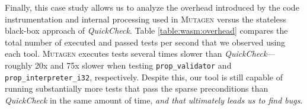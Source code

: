 \documentclass[sigconf, anonymous, review]{acmart}
\newcommand{\quickcheck}{\textit{QuickCheck}\xspace}
\newcommand{\mutagen}{\textsc{Mutagen}\xspace}
\begin{document}
Finally, this case study allows us to analyze the overhead introduced by the
code instrumentation and internal processing used in \mutagen versus the
stateless black-box approach of \quickcheck.
%
Table \ref{table:wasm:overhead} compares the total number of executed and passed
tests per second that we observed using each tool.
%
\mutagen executes tests several times slower than \quickcheck --- roughly 20x
and 75x slower when testing \texttt{prop\_validator} and
\texttt{prop\_interpreter\_i32}, respectively.
%
Despite this, our tool is still capable of running substantially more tests that
pass the sparse preconditions than \quickcheck in the same amount of time,
\emph{and that ultimately leads us to find bugs}.






\end{document}
